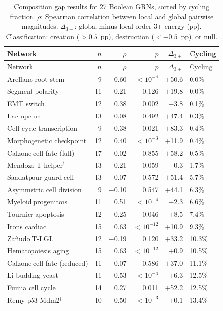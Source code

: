 \documentclass[11pt]{article}
\begin{document}
\begin{longtable}{lrrrrl}
\caption{Composition gap results for 27 Boolean GRNs, sorted by
cycling fraction. $\rho$: Spearman correlation between local and
global pairwise magnitudes. $\Delta_{3+}$: global minus local
order-3+ energy (pp). Classification: creation ($> 0.5$~pp),
destruction ($< -0.5$~pp), or null.}
\label{tab:all_results} \\
\toprule
Network & $n$ & $\rho$ & $p$ & $\Delta_{3+}$ & Cycling \\
\midrule
\endfirsthead
\toprule
Network & $n$ & $\rho$ & $p$ & $\Delta_{3+}$ & Cycling \\
\midrule
\endhead
\bottomrule
\endfoot
Arellano root stem & 9 & 0.60 & $< 10^{-4}$ & $+$50.6 & 0.0\% \\
Segment polarity & 11 & 0.21 & 0.126 & $+$19.8 & 0.0\% \\
EMT switch & 12 & 0.38 & 0.002 & $-$3.8 & 0.1\% \\
Lac operon & 13 & 0.08 & 0.492 & $+$47.4 & 0.3\% \\
Cell cycle transcription & 9 & $-$0.38 & 0.021 & $+$83.3 & 0.4\% \\
Morphogenetic checkpoint & 12 & 0.40 & $< 10^{-3}$ & $+$11.9 & 0.4\% \\
Calzone cell fate (full) & 17 & $-$0.02 & 0.855 & $+$58.2 & 0.5\% \\
Mendoza T-helper$^\dagger$ & 13 & 0.21 & 0.059 & $-$0.3 & 1.7\% \\
Saadatpour guard cell & 13 & 0.07 & 0.572 & $+$51.4 & 5.7\% \\
Asymmetric cell division & 9 & $-$0.10 & 0.547 & $+$44.1 & 6.3\% \\
Myeloid progenitors & 11 & 0.51 & $< 10^{-4}$ & $-$2.3 & 6.6\% \\
Tournier apoptosis & 12 & 0.25 & 0.046 & $+$8.5 & 7.4\% \\
Irons cardiac & 15 & 0.63 & $< 10^{-12}$ & $+$10.9 & 9.3\% \\
Za\~nudo T-LGL & 12 & $-$0.19 & 0.120 & $+$33.2 & 10.3\% \\
Hematopoiesis aging & 15 & 0.63 & $< 10^{-12}$ & $+$0.9 & 10.5\% \\
Calzone cell fate (reduced) & 11 & $-$0.07 & 0.586 & $+$37.0 & 11.1\% \\
Li budding yeast & 11 & 0.53 & $< 10^{-4}$ & $+$6.3 & 12.5\% \\
Fumia cell cycle & 14 & 0.27 & 0.011 & $+$52.2 & 12.5\% \\
Remy p53-Mdm2$^\dagger$ & 10 & 0.50 & $< 10^{-3}$ & $+$0.1 & 13.4\% \\

\end{longtable}
\end{document}
